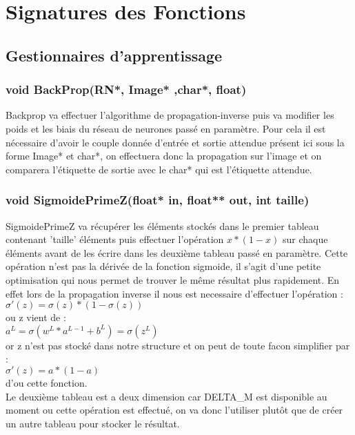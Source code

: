 \documentclass{article}
\begin{document}
	
	
	
	
	
\section{Signatures des Fonctions}
	\subsection{Gestionnaires d'apprentissage}
			\subsubsection{\textcolor{myblue}{\textbf{void}} BackProp(\textcolor{myblue}{\textbf{RN*}}, \textcolor{myblue}{\textbf{Image*}} ,\textcolor{myblue}{\textbf{char*}}, \textcolor{myblue}{\textbf{float}})}
				Backprop va effectuer l'algorithme de propagation-inverse puis va modifier les poids et les biais du réseau de neurones passé en paramètre. Pour cela il est nécessaire d'avoir le couple donnée d'entrée et sortie attendue présent ici sous la forme Image* et char*, on effectuera donc la propagation sur l'image et on comparera l'étiquette de sortie avec le char* qui est l'étiquette attendue.
				
			\subsubsection{\textcolor{myblue}{\textbf{void}} SigmoidePrimeZ(\textcolor{myblue}{\textbf{float*}} in, \textcolor{myblue}{\textbf{float**}} out, \textcolor{myblue}{\textbf{int}} taille)}
			SigmoidePrimeZ va récupérer les éléments stockés dans le premier tableau contenant 'taille' éléments puis effectuer l'opération $x*(1-x)$ sur chaque éléments avant de les écrire dans les deuxième tableau passé en paramètre. Cette opération n'est pas la dérivée de la fonction sigmoide, il s'agit d'une petite optimisation qui nous permet de trouver le même résultat plus rapidement. En effet lors de la propagation inverse il nous est necessaire d'effectuer l'opération : \\$\sigma'(z) = \sigma(z)*(1-\sigma(z))$\\ ou z vient de : \\$a^L = \sigma(w^L*a^{L-1}+b^L) = \sigma(z^L)$\\ or z n'est pas stocké dans notre structure et on peut de toute facon simplifier par :\\$\sigma'(z)=a*(1-a)$\\ d'ou cette fonction.\\
			Le deuxième tableau est a deux dimension car DELTA\_M est disponible au moment ou cette opération est effectué, on va donc l'utiliser plutôt que de créer un autre tableau pour stocker le résultat.
			
\end{document}

